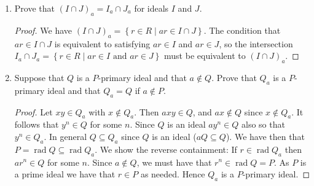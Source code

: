 \documentclass[11pt]{article}
\newcommand{\cbr}[1]{\left\{#1\right\}}
\DeclareMathOperator{\rad}{rad}
\begin{document}
\begin{enumerate}
\begin{enumerate}
\begin{proof}
            If $a\in I$ then since $I$ is an ideal, for any element $r\in R$ we have $ar\in I$ since $I$ is an ideal, so $I_a = R$. Conversely, if $I_a = R$ then $1\in I_a$ so that $a1 = a\in I$.
        \end{proof}
        \item Prove that $(I\cap J)_a = I_a\cap J_a$ for ideals $I$ and $J$. \begin{proof}
            We have $(I\cap J)_a = \cbr{r\in R\mid ar\in I\cap J}$. The condition that $ar\in I\cap J$ is equivalent to satisfying $ar\in I$ and $ar\in J$, so the intersection $I_a\cap J_a = \cbr{r\in R\mid ar\in I \text{ and }ar\in J}$ must be equivalent to $(I\cap J)_a$.
        \end{proof}
        \item Suppose that $Q$ is a $P$-primary ideal and that $a\not\in Q$. Prove that $Q_a$ is a $P$-primary ideal and that $Q_a=Q$ if $a\not\in P$. \begin{proof}
            Let $xy\in Q_a$ with $x\not\in Q_a$. Then $axy\in Q$, and $ax\not\in Q$ since $x\not\in Q_a$. It follows that $y^n\in Q$ for some $n$. Since $Q$ is an ideal $ay^n\in Q$ also so that $y^n\in Q_a$. In general $Q\subseteq Q_a$ since $Q$ is an ideal ($aQ\subseteq Q$). We have then that $P= \rad Q\subseteq \rad Q_a$. We show the reverse containment: If $r\in \rad Q_a$ then $ar^n\in Q$ for some $n$. Since $a\not\in Q$, we must have that $r^n \in \rad Q = P$. As $P$ is a prime ideal we have that $r\in P$ as needed. Hence $Q_a$ is a $P$-primary ideal.


\end{proof}
\end{enumerate}
\end{enumerate}
\end{document}

